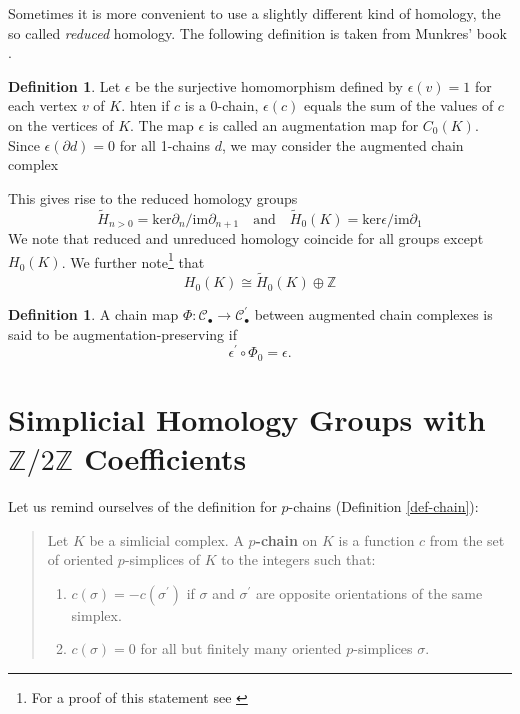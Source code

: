\documentclass[toc=bib, headinclude]{scrartcl}
\theoremstyle{plain}
\theoremstyle{definition}
\newtheorem	{definition}[theorem]{Definition}
\theoremstyle{remark}
\newcommand{\isom}{\cong}
\newcommand{\SH}{Simplicial Homology}
\newcommand{\Z}{\mathbb{Z}}
\newcommand{\qandq}{\quad \text{and} \quad}
\begin{document}
Sometimes it is more convenient to use a slightly different kind of homology, the so called \emph{reduced} homology. The following definition is taken from Munkres' book \parencite[p. 43]{mu}.
\begin{definition}
	Let $\epsilon$ be the surjective homomorphism defined by $\epsilon(v)=1$ for each vertex $v$ of $K$. hten if $c$ is a 0-chain, $\epsilon(c)$ equals the sum of the values of $c$ on the vertices of $K$. The map $\epsilon$ is called an augmentation map for $C_0(K)$. Since $\epsilon(\partial d)=0$ for all 1-chains $d$, we may consider the augmented chain complex
	\begin{center}
\end{center}
This gives rise to the reduced homology groups
\[
\tilde{H}_{n>0}=\mathrm{ker}\partial_n/\mathrm{im}\partial_{n+1}\qandq \tilde{H}_0(K)=\mathrm{ker}\epsilon/\mathrm{im}\partial_1
\]
We note that reduced and unreduced homology coincide for all groups except $H_0(K)$. We further note\footnote{For a proof of this statement see \parencite[p. 43]{mu}} that 
\[
H_0(K)\isom \tilde{H}_0(K)\oplus \Z
\]
\end{definition}
\begin{definition}
	A chain map $\Phi: \mathcal{C}_\bullet\to \mathcal{C}^\prime_\bullet$ between augmented chain complexes is said to be augmentation-preserving if \[
	\epsilon^\prime\circ \Phi_0=\epsilon.
	\]
\end{definition}

\section{\SH{} Groups with $\mathbb{Z}/2\mathbb{Z}$ Coefficients}

Let us remind ourselves of the definition for $p$-chains (Definition \ref{def-chain}):
\begin{quotation}
	Let $K$ be a simlicial complex. A \textbf{$p$-chain} on $K$ is a function $c$ from the set of oriented $p$-simplices of $K$ to the integers such that:
	\begin{enumerate}
		\item $c(\sigma)=-c(\sigma^\prime)$ if $\sigma$ and $\sigma^\prime$ are opposite orientations of the same simplex.
		\item $c(\sigma)=0$ for all but finitely many oriented $p$-simplices $\sigma$.
	\end{enumerate}
\end{quotation}
\end{document}
